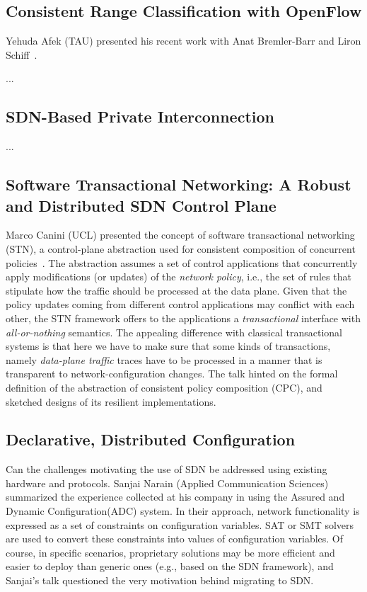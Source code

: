 \documentclass[11pt,pdftex,letter]{article}
\begin{document}
\subsection{Consistent Range Classification with OpenFlow} 

Yehuda Afek (TAU) presented his recent work with Anat Bremler-Barr and
Liron Schiff~\cite{AfekBS14}.   

...

\subsection{SDN-Based Private Interconnection}

...

\subsection{Software Transactional Networking: A Robust and
  Distributed SDN Control Plane}

Marco Canini (UCL) presented the concept of software transactional
networking (STN), a control-plane abstraction used for consistent
composition of concurrent policies~\cite{stn,tr-stn}. The abstraction assumes a set of
control applications that concurrently apply modifications (or
updates) of the
\emph{network policy}, i.e., the set of rules that stipulate how the
traffic should be processed at the data plane.     
Given that the policy updates coming from different control applications may
conflict with each other, the STN framework offers to the applications
a \emph{transactional} interface with \emph{all-or-nothing} semantics.
The appealing difference with classical transactional systems is that
here we have to make sure that some kinds of transactions, namely
\emph{data-plane traffic} traces have to be processed in a manner that
is transparent to network-configuration changes.    
The talk hinted on the formal definition of the abstraction of consistent policy
composition (CPC), and sketched designs of its resilient implementations.  
 
\subsection{Declarative, Distributed Configuration}

Can the challenges motivating the use of SDN be addressed using
existing hardware and protocols. Sanjai Narain (Applied Communication Sciences) summarized the
experience collected at his company in using the Assured and Dynamic
Configuration(ADC) system. In their approach, network functionality is
expressed as a set of constraints on configuration variables. SAT or
SMT solvers are used to convert these constraints into values of configuration variables.
Of course, in specific scenarios, proprietary solutions may be more
efficient and  easier to deploy than generic ones (e.g., based on the
SDN framework), and Sanjai's talk questioned the very
motivation behind migrating to SDN. 
\end{document}
